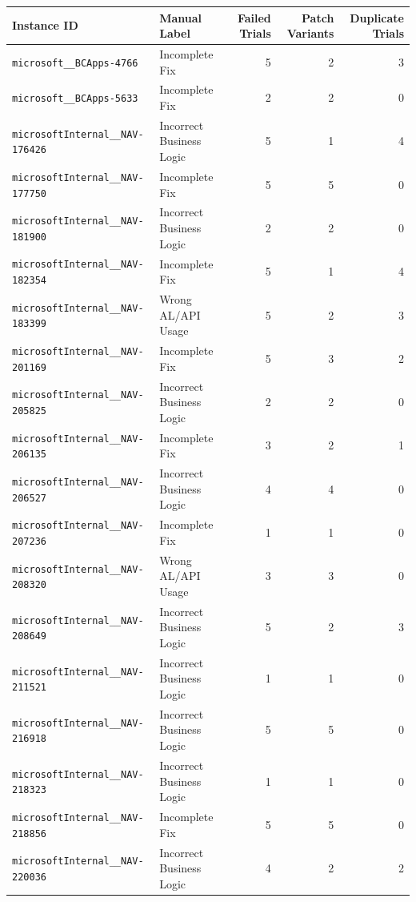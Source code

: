 \documentclass{article}
\begin{document}
\begin{center}
\label{tab:wrong_solution_task_labels}
\vskip 0.05in
\begingroup
\setlength{\tabcolsep}{4pt}
\begin{scriptsize}
\begin{tabular}{llrrr}
\toprule
\textbf{Instance ID} & \textbf{Manual Label} & \textbf{Failed Trials} & \textbf{Patch Variants} & \textbf{Duplicate Trials} \\
\midrule
\texttt{microsoft\_\_BCApps-4766} & Incomplete Fix & 5 & 2 & 3 \\
\texttt{microsoft\_\_BCApps-5633} & Incomplete Fix & 2 & 2 & 0 \\
\texttt{microsoftInternal\_\_NAV-176426} & Incorrect Business Logic & 5 & 1 & 4 \\
\texttt{microsoftInternal\_\_NAV-177750} & Incomplete Fix & 5 & 5 & 0 \\
\texttt{microsoftInternal\_\_NAV-181900} & Incorrect Business Logic & 2 & 2 & 0 \\
\texttt{microsoftInternal\_\_NAV-182354} & Incomplete Fix & 5 & 1 & 4 \\
\texttt{microsoftInternal\_\_NAV-183399} & Wrong AL/API Usage & 5 & 2 & 3 \\
\texttt{microsoftInternal\_\_NAV-201169} & Incomplete Fix & 5 & 3 & 2 \\
\texttt{microsoftInternal\_\_NAV-205825} & Incorrect Business Logic & 2 & 2 & 0 \\
\texttt{microsoftInternal\_\_NAV-206135} & Incomplete Fix & 3 & 2 & 1 \\
\texttt{microsoftInternal\_\_NAV-206527} & Incorrect Business Logic & 4 & 4 & 0 \\
\texttt{microsoftInternal\_\_NAV-207236} & Incomplete Fix & 1 & 1 & 0 \\
\texttt{microsoftInternal\_\_NAV-208320} & Wrong AL/API Usage & 3 & 3 & 0 \\
\texttt{microsoftInternal\_\_NAV-208649} & Incorrect Business Logic & 5 & 2 & 3 \\
\texttt{microsoftInternal\_\_NAV-211521} & Incorrect Business Logic & 1 & 1 & 0 \\
\texttt{microsoftInternal\_\_NAV-216918} & Incorrect Business Logic & 5 & 5 & 0 \\
\texttt{microsoftInternal\_\_NAV-218323} & Incorrect Business Logic & 1 & 1 & 0 \\
\texttt{microsoftInternal\_\_NAV-218856} & Incomplete Fix & 5 & 5 & 0 \\
\texttt{microsoftInternal\_\_NAV-220036} & Incorrect Business Logic & 4 & 2 & 2 \\

\end{tabular}
\end{scriptsize}
\end{center}
\end{document}
